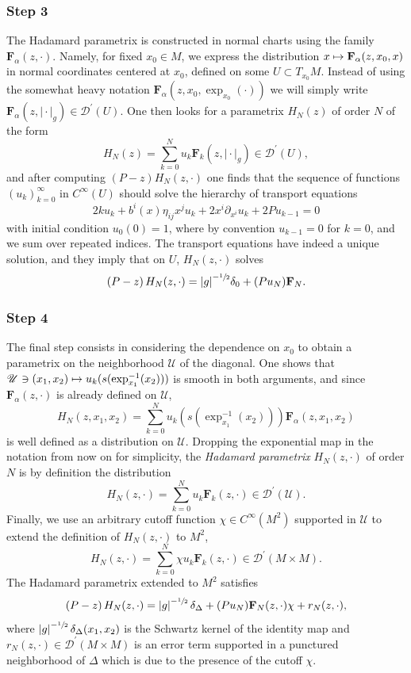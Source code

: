 \documentclass[10pt]{amsart}
\let\pazocal\mathscr
\def\mto{\mathchoice{\longmapsto}{\mapsto}{\mapsto}{\mapsto}}
\theoremstyle{definition}
\newcommand\cU{{\pazocal U}}
\let\diag\Delta
\let\cv\alpha
\let\varalpha s
\newcommand\Cf{C^\infty}
\newcommand{\module}[1]{\left|#1\right|}
\renewcommand{\boxed}[1]{#1}
\newcommand\varvarm{{x_0}}
\newcommand{\Fe}[2][\cv]{\mathbf{F}_{#1}(#2, \cdot)}
\newcommand{\Feg}[2][\cv]{\mathbf{F}_{#1}(#2, \vert {\cdot} \vert_g)}
\begin{document}
\subsubsection*{Step 3} The Hadamard parametrix is constructed in normal charts using the family $\Fe{z}$. Namely, for fixed
$\varvarm\in M$, we express the distribution $x\mto \mathbf{F}_\cv(z,\varvarm,x)$
in normal coordinates centered at $\varvarm$, defined on some $U\subset T_{x_0}{M}$. Instead of using the somewhat heavy notation $ \mathbf{F}_\cv(z,\varvarm,\exp_\varvarm(\cdot))$ we will simply write
$\Feg{z}\in \pazocal{D}^\prime(U)$. One then looks for a parametrix $H_N(z)$ of order $N$ of the form
\[
\boxed{H_N(z)=\sum_{k=0}^N u_k \Feg[k]{z} \in \pazocal{D}^\prime(U) },
\]
and after computing $\left(P-z\right)H_N(z,\cdot)$ one finds that the sequence of functions
$(u_k)_{k=0}^\infty$ in $C^\infty(U)$ should solve the hierarchy of transport equations
\[
\boxed{2k u_k+ b^i(x)\eta_{ij}x^j u_k+2 x^i\partial_{x^i} u_k+2Pu_{k-1}=0}
\]
with initial condition $u_0(0)=1$, where by convention $u_{k-1}=0$ for $k=0$, and we sum over repeated indices. The transport equations have indeed a unique solution, and they imply that on $U$, $H_N(z,\cdot)$ solves
\[
\left(P-z\right)H_N(z,\cdot)={\module{g}^{-\sfrac{1}{2}}}\delta_0+(Pu_N)\mathbf{F}_N.
\]

\subsubsection*{Step 4} The final step consists in considering the dependence on $x_0$ to obtain a parametrix on the neighborhood $\cU$ of the diagonal. One shows that $\pazocal{U} \ni (x_1,x_2) \mto u_k(\varalpha(\exp_{x_1}^{-1}(x_2))) $ is smooth in both arguments, and since $\mathbf{F}_{\cv}(z,\cdot)$ is already defined on $\pazocal{U}$,
\[
H_N(z,x_1,x_2)=\sum_{k=0}^N u_k(\varalpha(\exp_{x_1}^{-1}(x_2)))\mathbf{F}_\cv(z,x_1,x_2)
\]
is well defined as a distribution on $\pazocal{U}$.
Dropping the exponential map in the notation from now on for simplicity, the \emph{Hadamard parametrix} $H_N(z,\cdot)$ of order $N$ is by definition the distribution
\[
\boxed{H_N(z,\cdot)=\sum_{k=0}^N u_k \Fe[k]{z}\in \pazocal{D}^\prime(\pazocal{U}).}
\]
Finally, we use an arbitrary cutoff function $\chi\in \Cf(M^2)$ supported in $\pazocal{U}$ to extend the definition of $H_N(z,\cdot)$ to $M^2$,
\[
\boxed{H_N(z,\cdot)=\sum_{k=0}^N \chi u_k \Fe[k]{z}\in \pazocal{D}^\prime({M\times M}).}
\]
The Hadamard parametrix extended to $M^2$ satisfies
\begin{equation}\label{eq:PzHN}
\left(P-z\right) H_N(z,\cdot)=\module{g}^{-\sfrac{1}{2}}\delta_{\diag}+(Pu_N)\mathbf{F}_N(z,\cdot)\chi+r_N(z,\cdot),
\end{equation}
where
$\module{g}^{-\sfrac{1}{2}}\delta_\Delta(x_1,x_2)$ is the Schwartz kernel of the identity map and $r_N(z,\cdot)\in \pazocal{D}^\prime({M\times M})$ is an error term supported in a punctured neighborhood of $\Delta$ which is due to the presence of the cutoff $\chi$.
\end{document}
